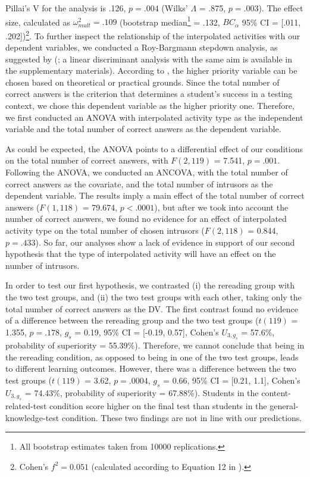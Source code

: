 \documentclass[
  11pt,
]{article}
\begin{document}
Pillai's V for the analysis is .126, \(p = .004\) (Wilks' \(\Lambda\) =
.875, \(p = .003\)). The effect size, calculated as
\(\omega^2_{mult} = .109\) (bootstrap
median\footnote{All bootstrap estimates taken from 10000 replications.}
= .132, \(BC_\alpha\) 95\% CI = {[}.011, .202{]})\footnote{
Cohen's \(f^2 = 0.051\) (calculated according to Equation 12 in
\citealp{steynjrEstimatingEffectSize2009}).
}. To further inspect the relationship of the interpolated activities
with our dependent variables, we conducted a Roy-Bargmann stepdown
analysis, as suggested by
\citeauthor{tabachnickUsingMultivariateStatistics2012}
(\citeyear{tabachnickUsingMultivariateStatistics2012}; a linear
discriminant analysis with the same aim is available in the
supplementary materials). According to
\citet{tabachnickUsingMultivariateStatistics2012}, the higher priority
variable can be chosen based on theoretical or practical grounds. Since
the total number of correct answers is the criterion that determines a
student's success in a testing context, we chose this dependent variable
as the higher priority one. Therefore, we first conducted an ANOVA with
interpolated activity type as the independent variable and the total
number of correct answers as the dependent variable.

As could be expected, the ANOVA points to a differential effect of our
conditions on the total number of correct answers, with \(F(2, 119)\) =
7.541, \(p = .001\). Following the ANOVA, we conducted an ANCOVA, with
the total number of correct answers as the covariate, and the total
number of intrusors as the dependent variable. The results imply a main
effect of the total number of correct answers (\(F(1, 118)\) = 79.674,
\(p < .0001\)), but after we took into account the number of correct
answers, we found no evidence for an effect of interpolated activity
type on the total number of chosen intrusors (\(F (2, 118)\) = 0.844,
\(p = .433\)). So far, our analyses show a lack of evidence in support
of our second hypothesis that the type of interpolated activity will
have an effect on the number of intrusors.

In order to test our first hypothesis, we contrasted (i) the rereading
group with the two test groups, and (ii) the two test groups with each
other, taking only the total number of correct answers as the DV. The
first contrast found no evidence of a difference between the rereading
group and the two test groups (\(t(119)\) = 1.355, \(p = .178\), \(g_s\)
= 0.19, 95\% CI = {[}-0.19, 0.57{]}, Cohen's \(U_{3, g_s}\) = 57.6\%,
probability of superiority = 55.39\%). Therefore, we cannot conclude
that being in the rereading condition, as opposed to being in one of the
two test groups, leads to different learning outcomes. However, there
was a difference between the two test groups (\(t(119)\) = 3.62,
\(p = .0004\), \(g_s\) = 0.66, 95\% CI = {[}0.21, 1.1{]}, Cohen's
\(U_{3, g_s}\) = 74.43\%, probability of superiority = 67.88\%).
Students in the content-related-test condition score higher on the final
test than students in the general-knowledge-test condition. These two
findings are not in line with our predictions.
\end{document}

